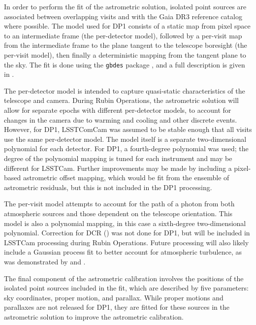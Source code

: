 In order to perform the fit of the astrometric solution, isolated point sources are associated between overlapping visits and with the Gaia \gls{DR3} \citep[][]{2023A&A...674A...1G} reference catalog where possible.
The model used for \gls{DP1} consists of a static map from pixel space to an intermediate frame (the per-detector model), followed by a per-visit map from the intermediate frame to the plane tangent to the telescope boresight (the per-visit model), then finally a deterministic mapping from the tangent plane to the sky.
The fit is done using the \texttt{gbdes} package \citep[][]{2017PASP..129g4503B}, and a full description is given in \citet{DMTN-266}.

The per-detector model is intended to capture quasi-static characteristics of the telescope and camera.
During \gls{Rubin Operations}, the astrometric solution will allow for separate epochs with different per-detector models, to account for changes in the camera due to warming and cooling and other discrete events.
However, for \gls{DP1}, \gls{LSSTComCam} was assumed to be stable enough that all visits use the same per-detector model. The model itself is a separate two-dimensional polynomial for each detector.
For \gls{DP1}, a fourth-degree polynomial was used; the degree of the polynomial mapping is tuned for each instrument and may be different for LSSTCam.
Further improvements may be made by including a pixel-based astrometric offset mapping, which would be fit from the ensemble of astrometric residuals, but this is not included in the \gls{DP1} processing.

The per-visit model attempts to account for the path of a photon from both atmospheric sources and those dependent on the telescope orientation.
This model is also a polynomial mapping, in this case a sixth-degree two-dimensional polynomial.
Correction for \gls{DCR} () was not done for \gls{DP1}, but will be included in \gls{LSSTCam} processing during \gls{Rubin Operations}.
Future processing will also likely include a Gaussian process fit to better account for atmospheric turbulence, as was demonstrated by \citet{2021AJ....162..106F} and \citet{2021A&A...650A..81L}.

The final component of the astrometric \gls{calibration} involves the positions of the isolated point sources included in the fit, which are described by five parameters: sky coordinates, proper motion, and parallax.
While proper motions and parallaxes are not released for \gls{DP1}, they are fitted for these sources in the astrometric solution to improve the astrometric calibration.

